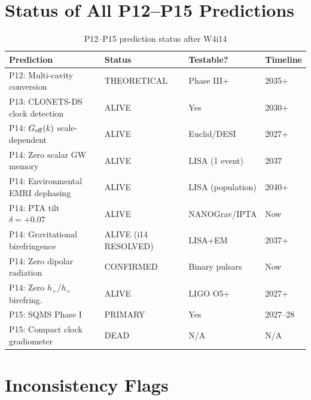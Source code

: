 \documentclass[11pt]{article}
\newcommand{\Geff}{G_{\rm eff}}
\begin{document}
\section{Status of All P12--P15 Predictions}

\begin{table}[H]
\centering
\caption{P12--P15 prediction status after W4i14}
\begin{tabular}{llll}
\toprule
Prediction & Status & Testable? & Timeline \\
\midrule
P12: Multi-cavity conversion & THEORETICAL & Phase III+ & 2035+ \\
P13: CLONETS-DS clock detection & ALIVE & Yes & 2030+ \\
P14: $\Geff(k)$ scale-dependent & ALIVE & Euclid/DESI & 2027+ \\
P14: Zero scalar GW memory & ALIVE & LISA (1 event) & 2037 \\
P14: Environmental EMRI dephasing & ALIVE & LISA (population) & 2040+ \\
P14: PTA tilt $\delta = +0.07$ & ALIVE & NANOGrav/IPTA & Now \\
P14: Gravitational birefringence & ALIVE (i14 RESOLVED) & LISA+EM & 2037+ \\
P14: Zero dipolar radiation & CONFIRMED & Binary pulsars & Now \\
P14: Zero $h_+$/$h_\times$ birefring. & ALIVE & LIGO O5+ & 2027+ \\
P15: SQMS Phase I & PRIMARY & Yes & 2027--28 \\
P15: Compact clock gradiometer & DEAD & N/A & N/A \\
\bottomrule
\end{tabular}
\end{table}

\section{Inconsistency Flags}
\end{document}

